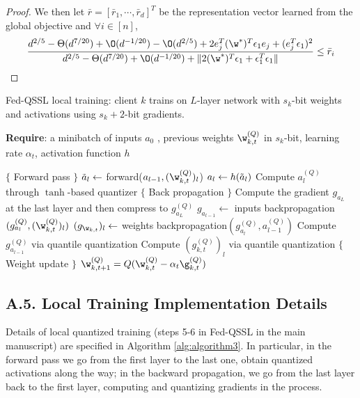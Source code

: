 \documentclass[a4paper,11pt]{article}
\begin{document}
\begin{proof}
We then let $\bar{r} = [\bar{r}_1, \cdots, \bar{r}_d ]^T$ be the representation vector learned from the global objective and $\forall i \in [n]$,
\begin{align*}
    \frac{d^{2/5} - \Theta(d^{7/20}) + \O(d^{-1/20}) - \O(d^{2/5}) + 2e_j^T (\w^*)^T \epsilon_1 e_j + (e_j^T \epsilon_1)^2 }{d^{2/5} - \Theta(d^{7/20}) + \O(d^{-1/20}) + \|2(\w^*)^T \epsilon_1 + \epsilon_1^T \epsilon_1  \|} \leq \bar{r}_i 
\end{align*}

\end{proof}

\begin{algorithm}[tb]
\renewcommand{\thealgorithm}{2}
\caption{Fed-QSSL local training: client $k$ trains on $L$-layer network with $s_k$-bit weights and activations using $s_k+2$-bit gradients.}
\label{alg:algorithm3}
\textbf{Require}: a minibatch of inputs $a_0$ , previous weights $\w^{(Q)}_{k, t}$ in $s_k$-bit, learning rate $\alpha_t$, activation function $h$ \\
\begin{algorithmic}[1] %
\STATE $\{$ Forward pass $\}$
\STATE $\Tilde{a}_l \leftarrow $ forward($a_{l-1}, (\w^{(Q)}_{k, t})_{l}$)
\STATE $a_{l} \leftarrow h(\Tilde{a}_l )$
\STATE Compute $a^{(Q)}_{l}$ through $\tanh$-based quantizer
\ENDFOR
\STATE $\{$ Back propagation $\}$
\STATE Compute the gradient $g_{a_L}$ at the last layer and then compress to $g^{(Q)}_{a_L}$
\STATE %
$g_{a_{l-1}} \leftarrow  $ inputs backpropagation$(g^{(Q)}_{a_l}, (\w^{(Q)}_{k, t})_{l} ) $
\STATE %
$(g_{\w_{k, t}})_{l} \leftarrow $ weights backpropagation$(g^{(Q)}_{a_l}, a^{(Q)}_{l-1}) $
\STATE Compute $g^{(Q)}_{a_{l-1}} $ via quantile quantization
\STATE Compute $(g^{(Q)}_{k, t})_{l}$ via quantile quantization
\ENDFOR
\STATE $\{$ Weight update $\}$
\STATE $ \w^{(Q)}_{k, t+1} = Q(\w^{(Q)}_{k, t} - \alpha_t \g^{(Q)}_{k, t}) $
\end{algorithmic}
\end{algorithm}

    \subsection*{A.5. Local Training Implementation Details}
    Details of local quantized training (steps 5-6 in Fed-QSSL in the main manuscript) are specified in Algorithm \ref{alg:algorithm3}. In particular, in the forward pass we go from the first layer to the last one, obtain quantized activations along the way; in the backward propagation, we go from the last layer back to the first layer, computing and quantizing gradients in the process.
	
	

	\clearpage
	
	
    
\end{document}
